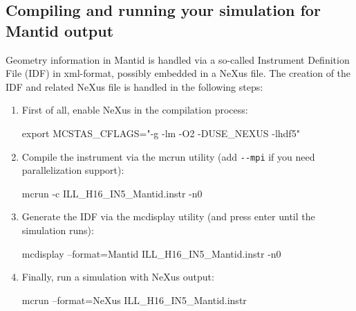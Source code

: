 \subsection{Compiling and running your simulation for Mantid output}
Geometry information in Mantid is handled via a so-called Instrument
Definition File (IDF) in xml-format, possibly embedded in a NeXus
file. The creation of the IDF and related NeXus file is handled in the
following steps:
\begin{enumerate}
\item First of all, enable NeXus in the compilation process:
 \begin{mcstas} 
   export MCSTAS_CFLAGS="-g -lm -O2 -DUSE_NEXUS -lhdf5"
 \end{mcstas}
\item Compile the instrument via the mcrun utility (add \verb+--mpi+
  if you need parallelization support):
 \begin{mcstas} 
   mcrun -c ILL_H16_IN5_Mantid.instr -n0
 \end{mcstas}
\item Generate the IDF via the mcdisplay utility (and press enter
  until the simulation runs):
 \begin{mcstas} 
   mcdisplay --format=Mantid ILL_H16_IN5_Mantid.instr -n0
 \end{mcstas}
\item Finally, run a simulation with NeXus output:
 \begin{mcstas} 
   mcrun --format=NeXus ILL_H16_IN5_Mantid.instr 
 \end{mcstas} 
\end{enumerate}


